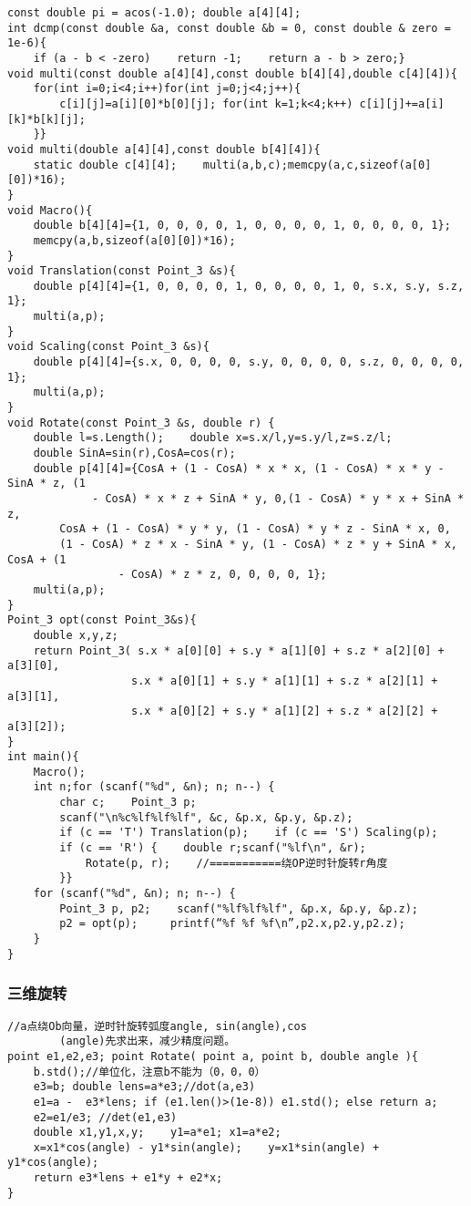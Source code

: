 \documentclass{article}
\begin{document}
\begin{lstlisting}
const double pi = acos(-1.0); double a[4][4];
int dcmp(const double &a, const double &b = 0, const double & zero = 1e-6){
    if (a - b < -zero)    return -1;    return a - b > zero;}
void multi(const double a[4][4],const double b[4][4],double c[4][4]){
    for(int i=0;i<4;i++)for(int j=0;j<4;j++){
        c[i][j]=a[i][0]*b[0][j]; for(int k=1;k<4;k++) c[i][j]+=a[i][k]*b[k][j];
    }}
void multi(double a[4][4],const double b[4][4]){
    static double c[4][4];    multi(a,b,c);memcpy(a,c,sizeof(a[0][0])*16);
}
void Macro(){
    double b[4][4]={1, 0, 0, 0, 0, 1, 0, 0, 0, 0, 1, 0, 0, 0, 0, 1};
    memcpy(a,b,sizeof(a[0][0])*16);
}
void Translation(const Point_3 &s){
    double p[4][4]={1, 0, 0, 0, 0, 1, 0, 0, 0, 0, 1, 0, s.x, s.y, s.z, 1};
    multi(a,p);
}
void Scaling(const Point_3 &s){
    double p[4][4]={s.x, 0, 0, 0, 0, s.y, 0, 0, 0, 0, s.z, 0, 0, 0, 0, 1};
    multi(a,p);
}
void Rotate(const Point_3 &s, double r) {
    double l=s.Length();    double x=s.x/l,y=s.y/l,z=s.z/l;
    double SinA=sin(r),CosA=cos(r);
    double p[4][4]={CosA + (1 - CosA) * x * x, (1 - CosA) * x * y - SinA * z, (1
             - CosA) * x * z + SinA * y, 0,(1 - CosA) * y * x + SinA * z,
        CosA + (1 - CosA) * y * y, (1 - CosA) * y * z - SinA * x, 0,
        (1 - CosA) * z * x - SinA * y, (1 - CosA) * z * y + SinA * x, CosA + (1
                 - CosA) * z * z, 0, 0, 0, 0, 1};
    multi(a,p);
}
Point_3 opt(const Point_3&s){
    double x,y,z;
    return Point_3( s.x * a[0][0] + s.y * a[1][0] + s.z * a[2][0] + a[3][0],
                   s.x * a[0][1] + s.y * a[1][1] + s.z * a[2][1] + a[3][1],
                   s.x * a[0][2] + s.y * a[1][2] + s.z * a[2][2] + a[3][2]);
}
int main(){
    Macro();
    int n;for (scanf("%d", &n); n; n--) {
        char c;    Point_3 p;
        scanf("\n%c%lf%lf%lf", &c, &p.x, &p.y, &p.z);
        if (c == 'T') Translation(p);    if (c == 'S') Scaling(p);
        if (c == 'R') {    double r;scanf("%lf\n", &r);
            Rotate(p, r);    //===========绕OP逆时针旋转r角度
        }}
    for (scanf("%d", &n); n; n--) {
        Point_3 p, p2;    scanf("%lf%lf%lf", &p.x, &p.y, &p.z);
        p2 = opt(p);     printf(“%f %f %f\n”,p2.x,p2.y,p2.z);
    }
}
\end{lstlisting}

\subsubsection{三维旋转}

\begin{lstlisting}
//a点绕Ob向量，逆时针旋转弧度angle, sin(angle),cos
        (angle)先求出来，减少精度问题。
point e1,e2,e3; point Rotate( point a, point b, double angle ){
    b.std();//单位化，注意b不能为（0，0，0）
    e3=b; double lens=a*e3;//dot(a,e3)
    e1=a -  e3*lens; if (e1.len()>(1e-8)) e1.std(); else return a;
    e2=e1/e3; //det(e1,e3)
    double x1,y1,x,y;    y1=a*e1; x1=a*e2;
    x=x1*cos(angle) - y1*sin(angle);    y=x1*sin(angle) + y1*cos(angle);
    return e3*lens + e1*y + e2*x;
}
\end{lstlisting}
\end{document}
